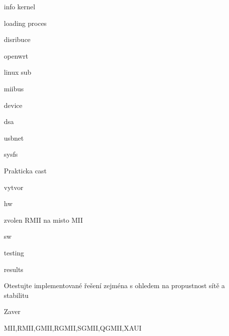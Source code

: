 \secc info kernel

\secc loading proces

\sec disribuce

\secc openwrt

\sec linux sub

\secc miibus

\secc device

\secc dsa

\secc usbnet

\secc sysfs

\sec Prakticka cast

\secc vytvor

\secc hw

\secc zvolen RMII na misto MII

\secc sw

\secc testing

\secc results

\secc Otestujte implementované řešení zejména s ohledem na propustnost sítě a stabilitu

\chap Zaver

MII,RMII,GMII,RGMII,SGMII,QGMII,XAUI
